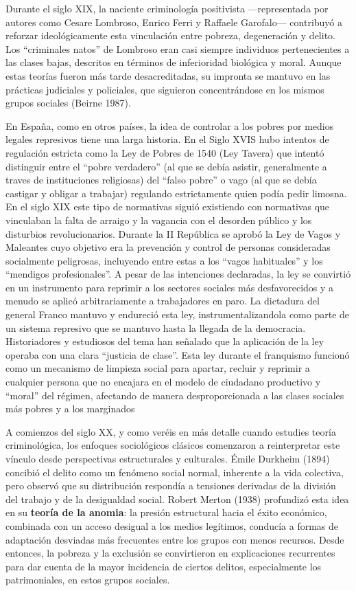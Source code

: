 \documentclass[
  spanish,
  letterpaper,
  DIV=11,
  numbers=noendperiod]{scrreprt}
\begin{document}
Durante el siglo XIX, la naciente criminología positivista
---representada por autores como Cesare Lombroso, Enrico Ferri y
Raffaele Garofalo--- contribuyó a reforzar ideológicamente esta
vinculación entre pobreza, degeneración y delito. Los ``criminales
natos'' de Lombroso eran casi siempre individuos pertenecientes a las
clases bajas, descritos en términos de inferioridad biológica y moral.
Aunque estas teorías fueron más tarde desacreditadas, su impronta se
mantuvo en las prácticas judiciales y policiales, que siguieron
concentrándose en los mismos grupos sociales (Beirne 1987).

En España, como en otros países, la idea de controlar a los pobres por
medios legales represivos tiene una larga historia. En el Siglo XVIS
hubo intentos de regulación estricta como la Ley de Pobres de 1540 (Ley
Tavera) que intentó distinguir entre el ``pobre verdadero'' (al que se
debía asistir, generalmente a traves de instituciones religiosas) del
``falso pobre'' o vago (al que se debía castigar y obligar a trabajar)
regulando estrictamente quien podía pedir limosna. En el siglo XIX este
tipo de normativas siguió existiendo con normativas que vinculaban la
falta de arraigo y la vagancia con el desorden público y los disturbios
revolucionarios. Durante la II República se aprobó la Ley de Vagos y
Maleantes cuyo objetivo era la prevención y control de personas
consideradas socialmente peligrosas, incluyendo entre estas a los
``vagos habituales'' y los ``mendigos profesionales''. A pesar de las
intenciones declaradas, la ley se convirtió en un instrumento para
reprimir a los sectores sociales más desfavorecidos y a menudo se aplicó
arbitrariamente a trabajadores en paro. La dictadura del general Franco
mantuvo y endureció esta ley, instrumentalizandola como parte de un
sistema represivo que se mantuvo hasta la llegada de la democracia.
Historiadores y estudiosos del tema han señalado que la aplicación de la
ley operaba con una clara ``justicia de clase''. Esta ley durante el
franquismo funcionó como un mecanismo de limpieza social para apartar,
recluir y reprimir a cualquier persona que no encajara en el modelo de
ciudadano productivo y ``moral'' del régimen, afectando de manera
desproporcionada a las clases sociales más pobres y a los marginados

A comienzos del siglo XX, y como veréis en más detalle cuando estudies
teoría criminológica, los enfoques sociológicos clásicos comenzaron a
reinterpretar este vínculo desde perspectivas estructurales y
culturales. Émile Durkheim (1894) concibió el delito como un fenómeno
social normal, inherente a la vida colectiva, pero observó que su
distribución respondía a tensiones derivadas de la división del trabajo
y de la desigualdad social. Robert Merton (1938) profundizó esta idea en
su \textbf{teoría de la anomia}: la presión estructural hacia el éxito
económico, combinada con un acceso desigual a los medios legítimos,
conducía a formas de adaptación desviadas más frecuentes entre los
grupos con menos recursos. Desde entonces, la pobreza y la exclusión se
convirtieron en explicaciones recurrentes para dar cuenta de la mayor
incidencia de ciertos delitos, especialmente los patrimoniales, en estos
grupos sociales.
\end{document}
